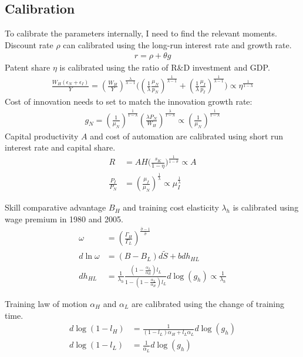 \documentclass[12pt]{article}
\begin{document}
\begin{appendices}
\section{Calibration}
To calibrate the parameters internally, I need to find the relevant moments. 
Discount rate $\rho$ can calibrated using the long-run interest rate and growth rate. 
\begin{align*}
r = \rho+\theta g
\end{align*}
Patent share $\eta$ is calibrated using the ratio of R\&D investment and GDP. 
\begin{align*}
\frac{W_H(\epsilon_N+\epsilon_I)}{Y} = (\frac{W_H}{Y})^{\frac{\lambda}{\lambda-1}}\Big((\frac{1}{\lambda}\frac{\mu_N}{p_N})^{\frac{1}{\lambda-1}}+(\frac{1}{\lambda}\frac{\mu_I}{p_I})^{\frac{1}{\lambda-1}}\Big) \propto \eta^{\frac{1}{1-\lambda}}
\end{align*}
Cost of innovation needs to set to match the innovation growth rate: 
\begin{align*}
g_N = (\frac{1}{\mu_N})^{\frac{1}{1-\lambda}}(\frac{\lambda P_N}{W_H})^{\frac{\lambda}{1-\lambda}} \propto (\frac{1}{\mu_N})^{\frac{1}{1-\lambda}}
\end{align*}
Capital productivity $A$ and cost of automation are calibrated using short run interest rate and capital share.  
\begin{align*}
R &= AH\Big(\frac{s_K}{1-\eta}\Big)^{\frac{1}{1-\hat{\sigma}}} \propto A \\
\frac{P_I}{P_N} &=(\frac{\mu_I}{\mu_N})^{\frac{1}{\lambda}} \propto \mu_I^{\frac{1}{\lambda}}
\end{align*}

Skill comparative advantage $B_H$ and training cost elasticity $\lambda_h$ is calibrated using wage premium in 1980 and 2005. 
\begin{align*}
\omega &= (\frac{\Gamma_H}{\Gamma_L})^{\frac{{\hat{\sigma}}-1}{\hat{\sigma}}} \\
d \ln \omega &=(B-B_L)d\tilde{S}+bdh_{HL}  \\
dh_{HL} &= \frac{1}{\lambda_h}\frac{(1-\frac{\alpha_L}{\alpha_H})l_L}{1-(1-\frac{\alpha_L}{\alpha_H})l_L}d\log(g_h) \propto \frac{1}{\lambda_h}
\end{align*}

Training law of motion $\alpha_H$ and $\alpha_L$ are calibrated using the change of training time. 
\begin{align*}
d\log(1-l_H) &= \frac{1}{(1-l_L)\alpha_H+l_L\alpha_L}d\log(g_h) \\
d\log(1-l_L) &= \frac{1}{\alpha_L}d\log(g_h) 
\end{align*}


\end{appendices}
\end{document}
